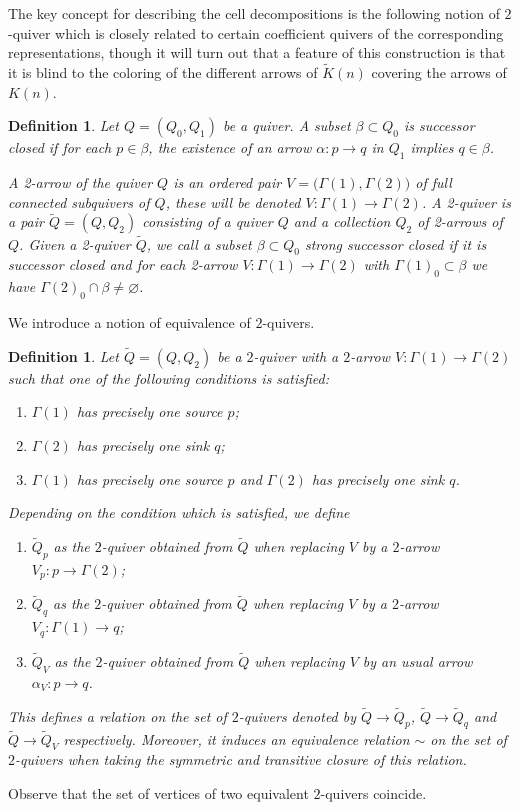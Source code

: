 \documentclass{amsart}
\newtheorem{definition}[theorem]{Definition}
\numberwithin{equation}{section}
\begin{document}
The key concept for describing the cell decompositions is the following notion of $2$-quiver which is closely related to certain coefficient quivers of the corresponding representations, though it will turn out that a feature of this construction is that it is blind to the coloring of the different arrows of $\widetilde K(n)$ covering the arrows of $K(n)$.
\begin{definition}
  Let $Q=(Q_0,Q_1)$ be a quiver.
  A subset $\beta\subset Q_0$ is \emph{successor closed} if for each $p\in\beta$, the existence of an arrow $\alpha:p\to q$ in $Q_1$ implies $q\in\beta$.

  A \emph{2-arrow} of the quiver $Q$ is an ordered pair $V=\big(\Gamma(1),\Gamma(2)\big)$ of full connected subquivers of $Q$, these will be denoted $V:\Gamma(1)\to\Gamma(2)$.
  A \emph{2-quiver} is a pair $\tilde Q=(Q,Q_2)$ consisting of a quiver $Q$ and a collection $Q_2$ of 2-arrows of $Q$.
  Given a 2-quiver $\tilde Q$, we call a subset $\beta\subset Q_0$ \emph{strong successor closed} if it is successor closed and for each 2-arrow $V:\Gamma(1)\to\Gamma(2)$ with $\Gamma(1)_0\subset\beta$ we have $\Gamma(2)_0\cap\beta\ne\varnothing$.  

\end{definition}
We introduce a notion of equivalence of $2$-quivers.
\begin{definition}\label{def:2equivalence}
Let $\tilde Q=(Q,Q_2)$ be a $2$-quiver with a $2$-arrow $V:\Gamma(1)\to\Gamma(2)$ such that one of the following conditions is satisfied:
\begin{enumerate}
\item $\Gamma(1)$ has precisely one source $p$; 
\item $\Gamma(2)$ has precisely one sink $q$;
\item $\Gamma(1)$ has precisely one source $p$ and $\Gamma(2)$ has precisely one sink $q$.
\end{enumerate}
Depending on the condition which is satisfied, we define
\begin{enumerate}
\item $\tilde Q_p$ as the $2$-quiver obtained from $\tilde Q$ when replacing $V$ by a $2$-arrow $V_p:p\to\Gamma(2)$;
\item $\tilde Q_q$ as the $2$-quiver obtained from $\tilde Q$ when replacing $V$ by a $2$-arrow $V_q:\Gamma(1)\to q$;
\item $\tilde Q_V$ as the $2$-quiver obtained from $\tilde Q$ when replacing $V$ by an usual arrow $\alpha_V:p\to q$. 
\end{enumerate}

This defines a relation on the set of $2$-quivers denoted by $\tilde Q\to \tilde Q_p$, $\tilde Q\to \tilde Q_q$ and $\tilde Q\to \tilde Q_V$ respectively. Moreover, it induces an equivalence relation $\sim$ on the set of $2$-quivers when taking the symmetric and transitive closure of this relation. 
\end{definition}
Observe that the set of vertices of two equivalent $2$-quivers coincide.
\end{document}
